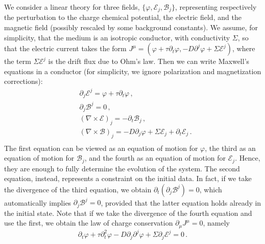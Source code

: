 \documentclass[a4paper, amsfonts, amssymb, amsmath, reprint, showkeys, nofootinbib, twoside,notitlepage,onecolumn,preprintnumbers]{revtex4-2}
\theoremstyle{definition}
\theoremstyle{theorem}
\theoremstyle{corollary}
\begin{document}
We consider a linear theory for three fields, $\{\varphi, \mathcal{E}_j,\mathcal{B}_j \}$, representing respectively the perturbation to the charge chemical potential, the electric field, and the magnetic field (possibly rescaled by some background constants). We assume, for simplicity, that the medium is an isotropic conductor, with conductivity $\Sigma$, so that the electric current takes the form $J^\mu=(\varphi+\tau \partial_t \varphi,-D \partial^j \varphi + \Sigma \mathcal{E}^j)$, where the term $\Sigma \mathcal{E}^j$ is the drift flux due to Ohm's law. Then we can write Maxwell's equations in a conductor (for simplicity, we ignore polarization and magnetization corrections):
\begin{equation}\label{maxone}
\begin{split}
& \partial_j \mathcal{E}^j = \varphi +\tau \partial_t \varphi \, , \\
& \partial_j \mathcal{B}^j = 0 \, , \\
& (\nabla \times \mathcal{E})_j =-\partial_t \mathcal{B}_j \, , \\
& (\nabla \times \mathcal{B})_j =-D \partial_j \varphi +\Sigma \mathcal{E}_j +\partial_t \mathcal{E}_j \, . \\
\end{split}
\end{equation}
The first equation can be viewed as an equation of motion for $\varphi$, the third as an equation of motion for $\mathcal{B}_j$, and the fourth as an equation of motion for $\mathcal{E}_j$. Hence, they are enough to fully determine the evolution of the system. The second equation, instead, represents a constraint on the initial data. In fact, if we take the divergence of the third equation, we obtain $\partial_t (\partial_j \mathcal{B}^j)=0$, which automatically implies $\partial_j \mathcal{B}^j =0$, provided that the latter equation holds already in the initial state. Note that if we take the divergence of the fourth equation and use the first, we obtain the law of charge conservation $\partial_\mu J^\mu =0$, namely
\begin{equation}\label{ioconservoetu?}
\partial_t \varphi +\tau \partial^2_t \varphi -D \partial_j \partial^j \varphi + \Sigma \partial_j \mathcal{E}^j =0 \, .
\end{equation}
\end{document}
